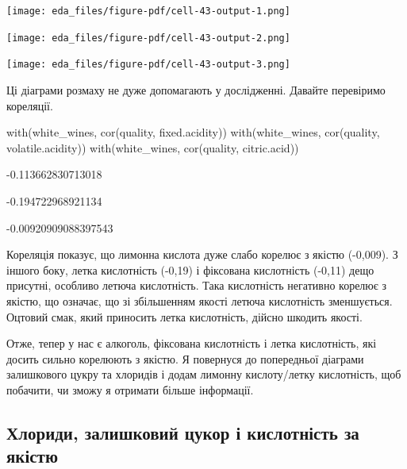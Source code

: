 \documentclass[
  letterpaper,
  DIV=11,
  numbers=noendperiod]{scrreprt}
\newenvironment{Shaded}{\begin{snugshade}}{\end{snugshade}}
\newcommand{\FunctionTok}[1]{\textcolor[rgb]{0.28,0.35,0.67}{#1}}
\newcommand{\NormalTok}[1]{\textcolor[rgb]{0.00,0.23,0.31}{#1}}
\begin{document}
\texttt{[image: eda\_files/figure-pdf/cell-43-output-1.png]}

\texttt{[image: eda\_files/figure-pdf/cell-43-output-2.png]}

\texttt{[image: eda\_files/figure-pdf/cell-43-output-3.png]}

Ці діаграми розмаху не дуже допомагають у дослідженні. Давайте
перевіримо кореляції.

\begin{Shaded}
\begin{Highlighting}[]
\FunctionTok{with}\NormalTok{(white\_wines, }\FunctionTok{cor}\NormalTok{(quality, fixed.acidity))}
\FunctionTok{with}\NormalTok{(white\_wines, }\FunctionTok{cor}\NormalTok{(quality, volatile.acidity))}
\FunctionTok{with}\NormalTok{(white\_wines, }\FunctionTok{cor}\NormalTok{(quality, citric.acid))}
\end{Highlighting}
\end{Shaded}

-0.113662830713018

-0.194722968921134

-0.00920909088397543

Кореляція показує, що лимонна кислота дуже слабо корелює з якістю
(-0,009). З іншого боку, летка кислотність (-0,19) і фіксована
кислотність (-0,11) дещо присутні, особливо летюча кислотність. Така
кислотність негативно корелює з якістю, що означає, що зі збільшенням
якості летюча кислотність зменшується. Оцтовий смак, який приносить
летка кислотність, дійсно шкодить якості.

Отже, тепер у нас є алкоголь, фіксована кислотність і летка кислотність,
які досить сильно корелюють з якістю. Я повернуся до попередньої
діаграми залишкового цукру та хлоридів і додам лимонну кислоту/летку
кислотність, щоб побачити, чи зможу я отримати більше інформації.

\subsection{Хлориди, залишковий цукор і кислотність за
якістю}\label{ux445ux43bux43eux440ux438ux434ux438-ux437ux430ux43bux438ux448ux43aux43eux432ux438ux439-ux446ux443ux43aux43eux440-ux456-ux43aux438ux441ux43bux43eux442ux43dux456ux441ux442ux44c-ux437ux430-ux44fux43aux456ux441ux442ux44e}
\end{document}
